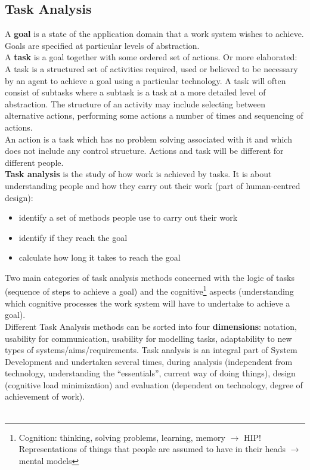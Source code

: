 \subsection{Task Analysis}
A \textbf{goal} is a state of the application domain that a work system wishes to achieve. Goals are specified at particular levels of abstraction. \\
A \textbf{task} is a goal together with some ordered set of actions. Or more elaborated:
A task is a structured set of activities required, used or believed to be necessary by an agent to achieve a goal using a particular technology. A task will often consist of subtasks where a subtask is a task at a more detailed level of abstraction. The structure of an activity may include selecting between alternative actions, performing some actions a number of times and sequencing of actions.\\
An action is a task which has no problem solving associated with it and which does not include any control structure. Actions and task will be different for different people.\\
\textbf{Task analysis} is the study of how work is achieved by tasks. It is about understanding people and how they carry out their work (part of human-centred design):
\begin{itemize}
\item identify a set of methods people use to carry out their work
\item identify if they reach the goal
\item calculate how long it takes to reach the goal
\end{itemize}
Two main categories of task analysis methods concerned with the logic of tasks (sequence of steps to achieve a goal) and the cognitive\footnote{Cognition: thinking, solving problems, learning, memory $\rightarrow$ HIP!\\ Representations of things that people are assumed to have in their heads $\rightarrow$ mental models} aspects (understanding which cognitive processes the work system will have to undertake to achieve a goal).\\
Different Task Analysis methods can be sorted into four \textbf{dimensions}: notation, usability for communication, usability for modelling tasks, adaptability to new types of systems/aims/requirements. Task analysis is an integral part of System Development and undertaken several times, during analysis (independent from technology, understanding the ``essentials'', current way of doing things), design (cognitive load minimization) and evaluation (dependent on technology, degree of achievement of work).\\ \\
